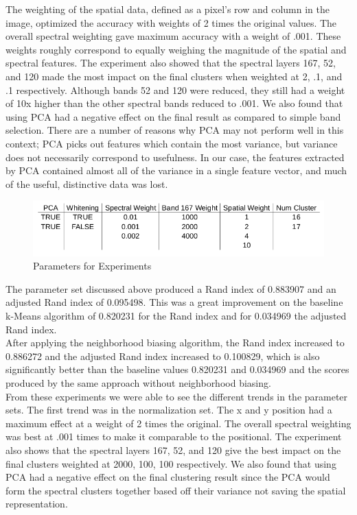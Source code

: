 \documentclass[journal]{IEEEtran}
\begin{document}
  The weighting of the spatial data, defined as a pixel’s row and column in the image, optimized the accuracy with weights of 2 times the original values. The overall spectral weighting gave maximum accuracy with a weight of .001. These weights roughly correspond to equally weighing the magnitude of the spatial and spectral features. The experiment also showed that the spectral layers 167, 52, and 120 made the most impact on the final clusters when weighted at 2, .1, and .1 respectively. Although bands 52 and 120 were reduced, they still had a weight of 10x higher than the other spectral bands reduced to .001. We also found that using PCA had a negative effect on the final result as compared to simple band selection. There are a number of reasons why PCA may not perform well in this context; PCA picks out features which contain the most variance, but variance does not necessarily correspond to usefulness. In our case, the features extracted by PCA contained almost all of the variance in a single feature vector, and much of the useful, distinctive data was lost.\\

  \begin{figure}[h!]
    \centering\includegraphics[width=\columnwidth]{images/parameters.png}
    \caption{Parameters for Experiments}
    \label{fig:Parameters}
  \end{figure}

  The parameter set discussed above produced a Rand index of 0.883907 and an adjusted Rand index of 0.095498. This was a great improvement on the baseline k-Means algorithm of 0.820231 for the Rand index and for 0.034969 the adjusted Rand index.\\

  After applying the neighborhood biasing algorithm, the Rand index increased to 0.886272 and the adjusted Rand index increased to 0.100829, which is also significantly better than the baseline values 0.820231 and 0.034969 and the scores produced by the same approach without neighborhood biasing.\\

  From these experiments we were able to see the different trends in the parameter sets. The first trend was in the normalization set. The x and y position had a maximum effect at a weight of 2 times the original. The overall spectral weighting was best at .001 times to make it comparable to the positional. The experiment also shows that the spectral layers 167, 52, and 120 give the best impact on the final clusters weighted at 2000, 100, 100 respectively. We also found that using PCA had a negative effect on the final clustering result since the PCA would form the spectral clusters together based off their variance not saving the spatial representation.\\
\end{document}
